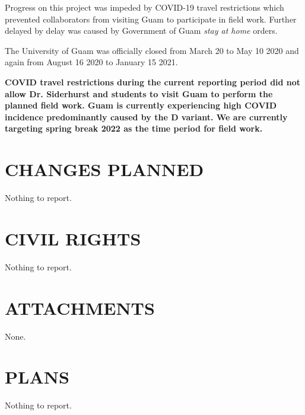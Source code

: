 \documentclass[12pt,letterpaper,english,bibliography=totocnumbered,abstract=on]{scrartcl}
\begin{document}

Progress on this project was impeded by COVID-19 travel restrictions which prevented collaborators from visiting Guam to participate in field work. Further delayed by delay was caused by Government of Guam \textit{stay at home} orders. 

The University of Guam was officially closed from March 20 to May 10 2020 and again from August 16 2020 to January 15 2021.

\textbf{COVID travel restrictions during the current reporting period did not allow Dr. Siderhurst and students to visit Guam to perform the planned field work. Guam is currently experiencing high COVID incidence predominantly caused by the D variant. We are currently targeting spring break 2022 as the time period for field work.}

\section{CHANGES PLANNED}


Nothing to report.

\section{CIVIL RIGHTS}


Nothing to report.

\section{ATTACHMENTS}


None.

\section{PLANS}


Nothing to report.
\end{document}
